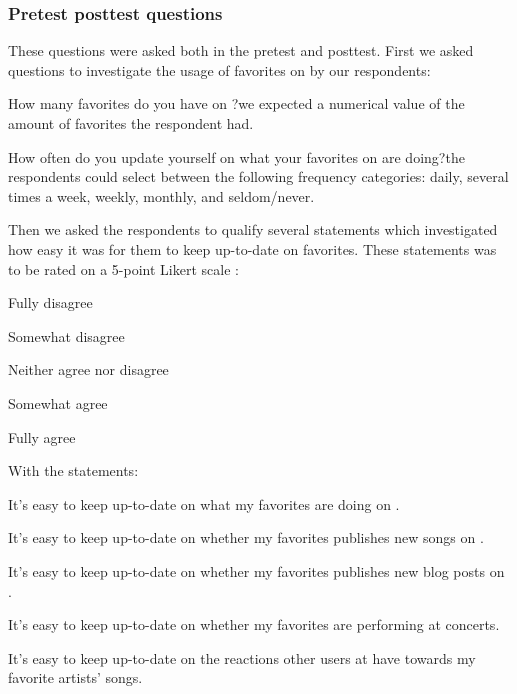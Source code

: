 \subsubsection{Pretest \oldand posttest questions}

These questions were asked both in the pretest and posttest. First we asked
questions to investigate the usage of favorites on \urort{} by our
respondents:

\begin{items}
  \item How many favorites do you have on \urort{}?\dash{}we expected
    a numerical value of the amount of favorites the respondent had.
  \item How often do you update yourself on what your favorites on \urort{}
    are doing?\dash{}the respondents could select between the following
    frequency categories: daily, several times a week, weekly, monthly,
    and seldom/never.
\end{items}

Then we asked the respondents to qualify several statements which investigated
how easy it was for them to keep up-to-date on favorites.
These statements
was to be rated on a 5-point Likert scale \citep{likert32}:

\begin{items}
  \item Fully disagree
  \item Somewhat disagree
  \item Neither agree nor disagree
  \item Somewhat agree
  \item Fully agree
\end{items}

With the statements:

\begin{items}
  \item It's easy to keep up-to-date on what my favorites are doing
    on \urort{}.
  \item It's easy to keep up-to-date on whether my favorites publishes
    new songs on \urort{}.
  \item It's easy to keep up-to-date on whether my favorites publishes
    new blog posts on \urort{}.
  \item It's easy to keep up-to-date on whether my favorites are
    performing at concerts.
  \item It's easy to keep up-to-date on the reactions other users at
    \urort{} have towards my favorite artists' songs.
\end{items}

